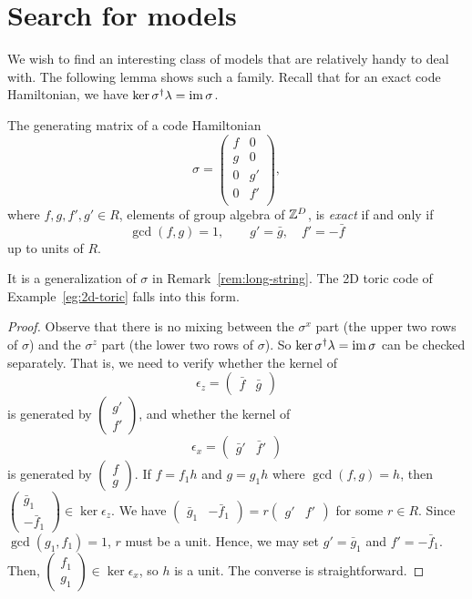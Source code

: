 \section{Search for models}

We wish to find an interesting class of models
that are relatively handy to deal with.
The following lemma shows such a family.
Recall that for an exact code Hamiltonian,
we have $\ker \sigma^\dagger \lambda = \mathop{\mathrm{im}}\nolimits \sigma$.
\begin{lem}
The generating matrix of a code Hamiltonian
\[
\sigma =
\begin{pmatrix}
f & 0 \\
g & 0 \\
0 & g' \\
0 & f' \\
\end{pmatrix},
\]
where $f,g,f',g' \in R$, elements of group algebra of $\mathbb{Z}^D$,
is \emph{exact}
if and only if 
\[
\gcd(f,g)=1,
\quad \quad
g' = \bar g,
\quad
 f' = -\bar f 
\]
up to units of $R$.
\label{lem:two-terms-CSS-exactness-condition}
\end{lem}
\noindent
It is a generalization of $\sigma$ in Remark~\ref{rem:long-string}.
The 2D toric code of Example~\ref{eg:2d-toric} falls into this form.
\begin{proof}
Observe that there is no mixing between 
the $\sigma^x$ part (the upper two rows of $\sigma$)
and the $\sigma^z$ part (the lower two rows of $\sigma$).
So $\ker \sigma^\dagger \lambda = \mathop{\mathrm{im}}\nolimits \sigma$ can be checked
separately.
That is, we need to verify whether the kernel of
\[
\epsilon_z = \begin{pmatrix} \bar f & \bar g \end{pmatrix}
\]
is generated by $\begin{pmatrix} g' \\ f' \end{pmatrix}$,
and whether the kernel of
\[
\epsilon_x = \begin{pmatrix} \bar g' & \bar f' \end{pmatrix}
\]
is generated by $\begin{pmatrix} f \\ g \end{pmatrix}$.
If $f = f_1 h$ and $g = g_1 h$ where $\gcd(f,g)=h$,
then $\begin{pmatrix} \bar g_1 \\ -\bar f_1 \end{pmatrix} \in \ker \epsilon_z$.
We have $\begin{pmatrix} \bar g_1 & -\bar f_1 \end{pmatrix}
 = r \begin{pmatrix} g' & f' \end{pmatrix}$ for some $r \in R$.
Since $\gcd(g_1, f_1)=1$, $r$ must be a unit.
Hence, we may set $g' = \bar g_1$ and $f' = -\bar f_1$.
Then, $\begin{pmatrix} f_1 \\ g_1 \end{pmatrix} \in \ker \epsilon_x$,
so $h$ is a unit. The converse is straightforward.
\end{proof}


